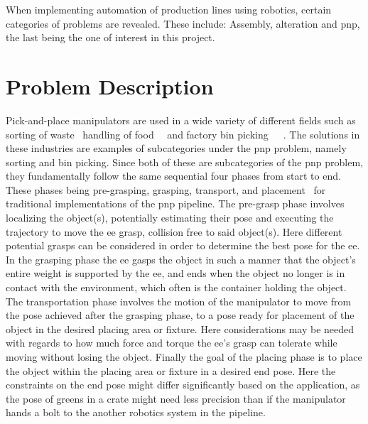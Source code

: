 When implementing automation of production lines using robotics, certain categories of problems are revealed. These include: Assembly, alteration and \gls{pnp}, the last being the one of interest in this project. 

\section{Problem Description}\label{sec:intro-problem-description}
Pick-and-place \gls{manipulator}s are used in a wide variety of different fields such as 
sorting of waste~\cite{robotic-pick-and-toss-facilitates-urban-waste-sorting}
handling of food~\cite{automation-of-mobile-pick-and-place-robotic-system-for-small-food-industry}~\cite{development-of-a-food-handling-soft-robot-hand-considering-a-high-speed-pick-and-place-task} and factory bin picking~\cite{real-time-industrial-bin-picking-with-a-hybrid-deep-learning-engineering-approach}~\cite{a-bin-picking-benchmark-for-systematic-evaluation-of-robotic-pick-and-place-systems}~\cite{generic-development-of-bin-pick-and-place-system-based-on-robot-operating-system}. The solutions in these industries are examples of subcategories under the \gls{pnp} problem, namely sorting and bin picking. Since both of these are subcategories of the \gls{pnp} problem, they fundamentally follow the same sequential four phases from start to end. 
These phases being pre-grasping, grasping, transport, and placement~\cite{a-bin-picking-benchmark-for-systematic-evaluation-of-robotic-pick-and-place-systems} for traditional implementations of the \gls{pnp} pipeline.
The pre-grasp phase involves localizing the object(s), potentially estimating their pose and executing the trajectory to move the \gls{ee} grasp, collision free to said object(s). Here different potential grasps can be considered in order to determine the best pose for the \gls{ee}.
In the grasping phase the \gls{ee} gasps the object in such a manner that the object's entire weight is supported by the \gls{ee}, and ends when the object no longer is in contact with the environment, which often is the container holding the object.
The transportation phase involves the motion of the \gls{manipulator} to move from the pose achieved after the grasping phase, to a pose ready for placement of the object in the desired placing area or fixture. Here considerations may be needed with regards to how much force and torque the \gls{ee}'s grasp can tolerate while moving without losing the object.
Finally the goal of the placing phase is to place the object within the placing area or fixture in a desired end pose. Here the constraints on the end pose might differ significantly based on the application, as the pose of greens in a crate might need less precision than if the manipulator hands a bolt to the another robotics system in the pipeline. \medskip

